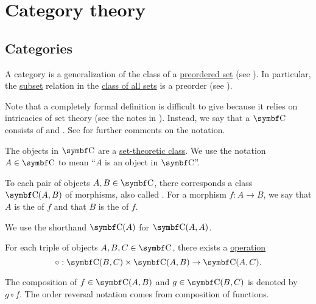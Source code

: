 \section{Category theory}\label{sec:category_theory}
\subsection{Categories}\label{subsec:categories}

\begin{definition}\label{def:category}
  A category is a generalization of the class of a \hyperref[def:preordered_set]{preordered set} (see ). In particular, the \hyperref[def:subset]{subset} relation in the \hyperref[def:set_zfc]{class of all sets} is a preorder (see ).

  Note that a completely formal definition is difficult to give because it relies on intricacies of set theory (see the notes in ). Instead, we say that a  \( \Cat{C} \) consists of  and . See  for further comments on the notation.

  \begin{DefEnum}[series=def:category]
     The objects in \( \Cat{C} \) are a \hyperref[def:set_zfc]{set-theoretic class}. We use the notation \( A \in \Cat{C} \) to mean \enquote{\( A \) is an object in \( \Cat{C} \)}.

     To each pair of objects \( A, B \in \Cat{C} \), there corresponds a class \( \Cat{C}(A, B) \) of morphisms, also called . For a morphism \( f: A \to B \), we say that \( A \) is the  of \( f \) and that \( B \) is the  of \( f \).

    We use the shorthand \( \Cat{C}(A) \) for \( \Cat{C}(A, A) \).

     For each triple of objects \( A, B, C \in \Cat{C} \), there exists a  \hyperref[def:function]{operation}
    \begin{equation*}
      \circ: \Cat{C}(B, C) \times \Cat{C}(A, B) \to \Cat{C}(A, C).
    \end{equation*}

    The composition of \( f \in \Cat{C}(A, B) \) and \( g \in \Cat{C}(B, C) \) is denoted by \( g \circ f \). The order reversal notation comes from composition of functions.
  \end{DefEnum}


\end{definition}
